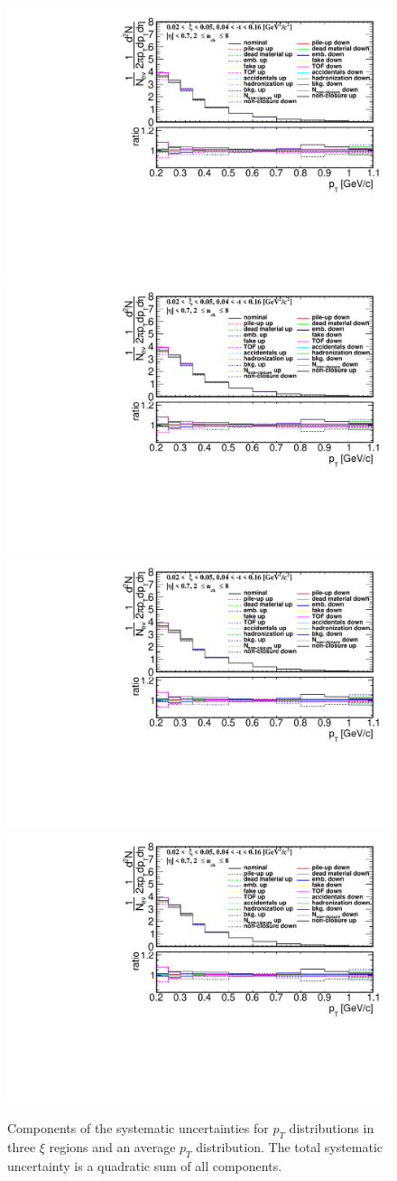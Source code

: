 \begin{figure}[h!]
	\centering
	\includegraphics[width=.47\textwidth,page=1]{chapters/chrgSTAR/img/syst/out_chargedmax.pdf}
	\hfill
	\includegraphics[width=.47\textwidth,page=7]{chapters/chrgSTAR/img/syst/out_chargedmax.pdf}
	\newline
	\includegraphics[width=.47\textwidth,page=13]{chapters/chrgSTAR/img/syst/out_chargedmax.pdf}
	\hfill
	\includegraphics[width=.47\textwidth,page=19]{chapters/chrgSTAR/img/syst/out_chargedmax.pdf}
	\caption[Components of the systematic uncertainties for $p_T$ distributions in three $\xi$ regions and the average $p_T$ distribution]{Components of the systematic uncertainties for $p_T$ distributions in three $\xi$ regions and an average $p_T$ distribution. The total  systematic uncertainty is a quadratic sum of all  components.}
	\label{fig:results_star_pt_syst}
\end{figure}	
